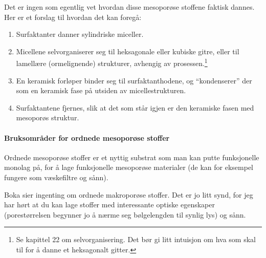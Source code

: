Det er ingen som egentlig vet hvordan disse mesoporøse stoffene faktisk dannes. Her er et forslag til hvordan det kan foregå:
\begin{enumerate}
	\item Surfaktanter danner sylindriske miceller.
	\item Micellene selvorganiserer seg til heksagonale eller kubiske gitre, eller til lamellære (ormelignende) strukturer, avhengig av prosessen.\footnote{Se kapittel 22 om selvorganisering. Det bør gi litt intuisjon om hva som skal til for å danne et heksagonalt gitter.}
	\item En keramisk forløper binder seg til surfaktanthodene, og ``kondenserer'' der som en keramisk fase på utsiden av micellestrukturen.
	\item Surfaktantene fjernes, slik at det som står igjen er den keramiske fasen med mesoporøs struktur.
\end{enumerate}

\paragraph{Bruksområder for ordnede mesoporøse stoffer} Ordnede mesoporøse stoffer er et nyttig substrat som man kan putte funksjonelle monolag på, for å lage funksjonelle mesoporøse materialer (de kan for eksempel fungere som væskefiltre og sånn).

Boka sier ingenting om ordnede makroporøse stoffer. Det er jo litt synd, for jeg har hørt at du kan lage stoffer med interessante optiske egenskaper (porestørrelsen begynner jo å nærme seg bølgelengden til synlig lys) og sånn.
